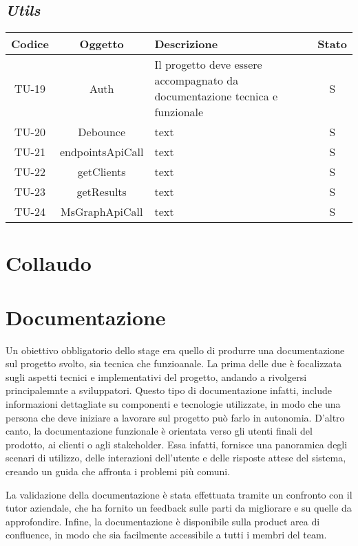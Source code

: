\subsection*{\emph{Utils}}


\begin{center}
  \label{tab:test-unita-utils}
  \begin{longtable}{|c|c|p{}|c|}
  \hline
  \textbf{Codice} & \textbf{Oggetto} & \textbf{Descrizione} & \textbf{Stato}\\
  \hline
  TU-19 &Auth &Il progetto deve essere accompagnato da documentazione tecnica e funzionale & S \\
  \hline
  TU-20 &Debounce &text &S \\
  \hline
  TU-21 &endpointsApiCall &text &S \\
  \hline
  TU-22 &getClients &text &S \\
  \hline
  TU-23 &getResults &text &S \\
  \hline
  TU-24 &MsGraphApiCall &text &S \\
  \hline
\end{longtable}
\end{center}



\section{Collaudo}
\section{Documentazione}
Un obiettivo obbligatorio dello stage era quello di produrre una documentazione sul progetto svolto, sia tecnica che funzioanale.
La prima delle due è focalizzata sugli aspetti tecnici e implementativi del progetto, andando a rivolgersi principalemnte a sviluppatori.
Questo tipo di documentazione infatti, include informazioni dettagliate su componenti e tecnologie utilizzate, in modo che una persona che deve iniziare a lavorare sul progetto
può farlo in autonomia.
D'altro canto, la documentazione funzionale è orientata verso gli utenti finali del prodotto, ai clienti o agli stakeholder.
Essa infatti, fornisce una panoramica degli scenari di utilizzo, delle interazioni dell'utente e delle risposte attese del sistema, creando un guida che affronta i problemi più comuni.


La validazione della documentazione è stata effettuata tramite un confronto con il tutor aziendale, che ha fornito un feedback sulle parti da migliorare e su quelle da approfondire.
Infine, la documentazione è disponibile sulla product area di confluence, in modo che sia facilmente accessibile a tutti i membri del team.

